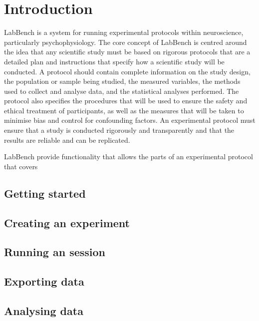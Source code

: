 \chapter{Introduction}
\label{ch:Introduction}

LabBench is a system for running experimental protocols within neuroscience, particularly psychophysiology. The core concept of LabBench is centred around the idea that any scientific study must be based on rigorous protocols that are a detailed plan and instructions that specify how a scientific study will be conducted. A protocol should contain complete information on the study design, the population or sample being studied, the measured variables, the methods used to collect and analyse data, and the statistical analyses performed. The protocol also specifies the procedures that will be used to ensure the safety and ethical treatment of participants, as well as the measures that will be taken to minimise bias and control for confounding factors. An experimental protocol must ensure that a study is conducted rigorously and transparently and that the results are reliable and can be replicated.

LabBench provide functionality that allows the parts of an experimental protocol that covers 


\section{Getting started}

\section{Creating an experiment}

\section{Running an session}

\section{Exporting data}

\section{Analysing data}

